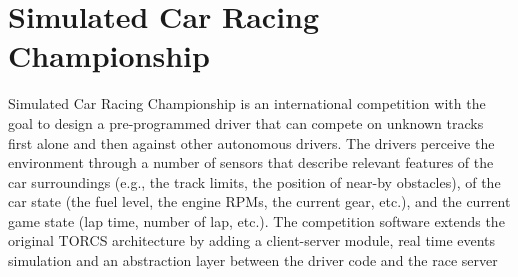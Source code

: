 \documentclass[binding=0.6cm,Lau,oneside]{sapthesis} %
\begin{document}
\section{Simulated Car Racing Championship}
\label{SCR}
Simulated Car Racing Championship is an international competition with the goal to design a pre-programmed driver that can compete on unknown tracks first alone and then against other autonomous drivers.\newline
The drivers perceive the environment through a number of sensors that describe relevant features of the car surroundings (e.g., the track limits, the position of near-by obstacles), of the car state (the fuel level, the engine RPMs, the current gear, etc.), and the current game state (lap time, number of lap, etc.).\newline
The competition software extends the original TORCS architecture by adding a client-server module, real time events simulation and an abstraction layer between the driver code and the race server\newline
\end{document}
